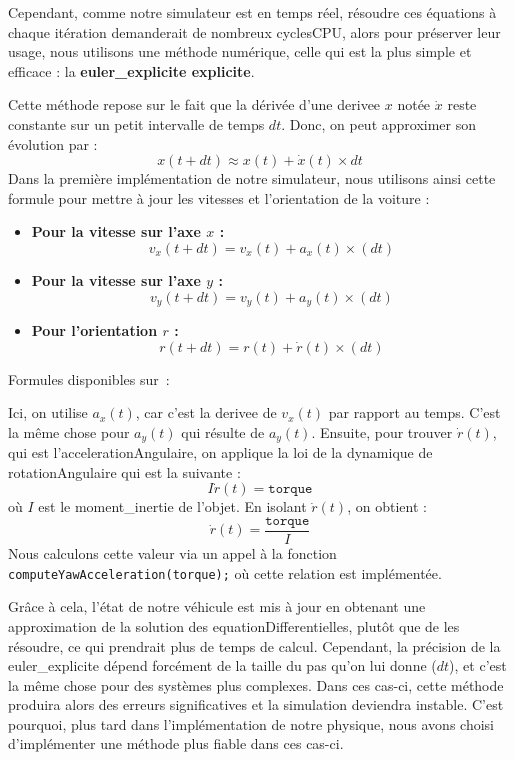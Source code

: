 Cependant, comme notre simulateur est en temps réel, résoudre ces équations à chaque itération demanderait de nombreux \gls{cyclesCPU}, alors pour préserver leur usage, nous utilisons une méthode numérique, celle qui est la plus simple et efficace : la \textbf{\gls{euler_explicite} explicite}.

Cette méthode repose sur le fait que la dérivée d'une \gls{derivee} $x$ notée $\dot{x}$ reste constante sur un petit intervalle de temps $dt$.
Donc, on peut approximer son évolution par :
$$x(t+dt) \approx x(t) + \dot{x}(t) \times dt$$
Dans la première implémentation de notre simulateur, nous utilisons ainsi cette formule pour mettre à jour les vitesses et l'orientation de la voiture :
\\



\begin{itemize}
    \item \textbf{Pour la vitesse sur l'axe $x$ :}
    $$v_x(t+dt) = v_x(t)+a_x(t)\times(dt)$$
    \item \textbf{Pour la vitesse sur l'axe $y$ :}
    $$v_y(t+dt) = v_y(t)+a_y(t)\times(dt)$$
    \item \textbf{Pour l'orientation $r$ :}
    $$r(t+dt) = r(t)+\dot{r}(t)\times(dt)$$
\end{itemize}

\begin{center}
    Formules disponibles sur~\cite{euler_explicite}:
\end{center}

Ici, on utilise $a_x(t)$, car c'est la \gls{derivee} de $v_x(t)$ par rapport au temps.
C'est la même chose pour $a_y(t)$ qui résulte de $a_y(t)$.
Ensuite, pour trouver $\dot{r}(t)$, qui est l'\gls{accelerationAngulaire}, on applique la loi de la dynamique de \gls{rotationAngulaire} qui est la suivante :
$$I\dot{r}(t) = \texttt{torque}$$
où $I$ est le \gls{moment_inertie} de l'objet.
En isolant $\dot{r}(t)$, on obtient :
$$\dot{r}(t)= \frac{\texttt{torque}}{I}$$
Nous calculons cette valeur via un appel à la fonction \texttt{computeYawAcceleration(torque);} où cette relation est implémentée.

Grâce à cela, l'état de notre véhicule est mis à jour en obtenant une approximation de la solution des \glspl{equationDifferentielle}, plutôt que de les résoudre, ce qui prendrait plus de temps de calcul.
Cependant, la précision de la \gls{euler_explicite} dépend forcément de la taille du pas qu'on lui donne ($dt$), et c'est la même chose pour des systèmes plus complexes.
Dans ces cas-ci, cette méthode produira alors des erreurs significatives et la simulation deviendra instable.
C'est pourquoi, plus tard dans l'implémentation de notre physique, nous avons choisi d'implémenter une méthode plus fiable dans ces cas-ci.

